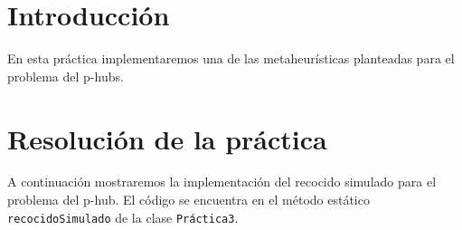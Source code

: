 \documentclass[12pt,a4paper,twoside,openright,titlepage,final]{article}
\author{José Ignacio Escribano}
\begin{document}
\setcounter{page}{1}


\listoftables
\thispagestyle{empty}
\newpage

\listoffigures
\thispagestyle{empty}
\newpage

\tableofcontents
\thispagestyle{empty}
\newpage


\setcounter{page}{1}

\section{Introducción}

En esta práctica implementaremos una de las metaheurísticas planteadas para el problema del p-hubs.


\section{Resolución de la práctica}

A continuación mostraremos la implementación del recocido simulado para el problema del p-hub. El código se encuentra en el método estático \texttt{recocidoSimulado} de la clase \texttt{Práctica3}.
\end{document}
